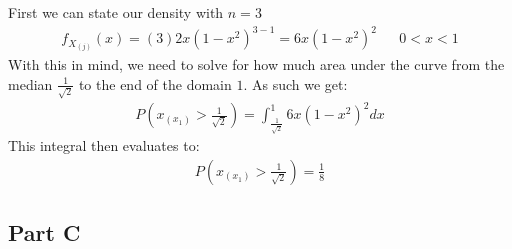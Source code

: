 \documentclass{article}
\begin{document}
First we can state our density with $n=3$
\begin{align*}
f_{X_{(j)}}(x) = (3) 2x (1-x^2)^{3-1} = 6x (1-x^2)^{2} && 0<x<1
\end{align*}
With this in mind, we need to solve for how much area under the curve from the median $\tfrac{1}{\sqrt{2}}$ to the end of the domain $1$. As such we get:
\begin{align*}
P(x_{(x_1)} > \tfrac{1}{\sqrt{2}}) = \int_{\tfrac{1}{\sqrt{2}}}^{1} 6x (1-x^2)^{2} dx
\end{align*}
This integral then evaluates to:
\begin{align*}
\boxed{ P(x_{(x_1)} > \tfrac{1}{\sqrt{2}}) = \frac{1}{8} }
\end{align*}
\subsection*{Part C}
\end{document}
